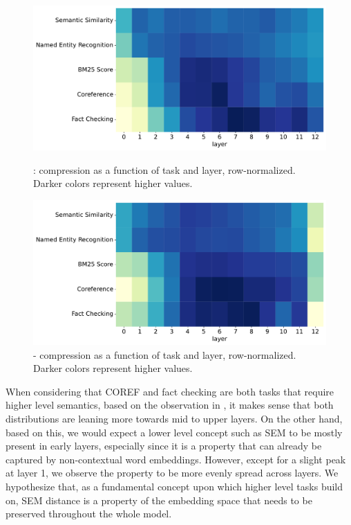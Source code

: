 \begin{figure}[!ht]
    \includegraphics[width=\textwidth]{gfx/probing/heatmap_compression_base}
    \caption{: compression as a function of task and layer, row-normalized. Darker colors represent higher values.}
    \label{fig:heatmap_comp_base}

    \includegraphics[width=\textwidth]{gfx/probing/heatmap_compression_passage}
    \caption{ - compression as a function of task and layer, row-normalized. Darker colors represent higher values.}
    \label{fig:heatmap_comp_passage}
\end{figure}

When considering that COREF and fact checking are both tasks that require higher level semantics, based on the observation in \citep{tenney-etal-2019-bert}, it makes sense that both distributions are leaning more towards mid to upper layers. On the other hand, based on this, we would expect a lower level concept such as SEM to be mostly present in early layers, especially since it is a property that can already be captured by non-contextual word embeddings. However, except for a slight peak at layer 1, we observe the property to be more evenly spread across layers. We hypothesize that, as a fundamental concept upon which higher level tasks build on, SEM distance is a property of the embedding space that needs to be preserved throughout the whole model.

